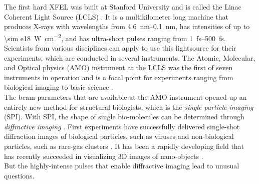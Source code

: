 %
The first hard XFEL was built at Stanford University and is called the Linac Coherent Light Source (LCLS) \citep{Emma-2010-NatPho}. It is a multikilometer long machine that produces X-rays with wavelengths from \SIrange{4.6}{0.1}{\nano\meter}, has intensities of up to \SI{\sim e18}{\watt\per\square\centi\meter}, and has ultra-short pulses ranging from \SIrange{1}{500}{\femto\second}. Scientists from various disciplines can apply to use this lightsource for their experiments, which are conducted in several instruments. The Atomic, Molecular, and Optical physics (AMO) instrument at the LCLS was the first of seven instruments in operation and is a focal point for experiments ranging from biological imaging to basic science \citep{Bostedt-2016-RMP}.\\[1\baselineskip]
%
The beam parameters that are available at the AMO instrument opened up an entirely new method for structural biologists, which is the \textit{single particle imaging} (SPI). With SPI, the shape of single bio-molecules can be determined through \textit{diffractive imaging} \citep{Chapman-2006-NatPhys}. First experiments have successfully delivered single-shot diffraction images of biological particles, such as viruses \citep{Seibert-2011-Nature} and non-biological particles, such as rare-gas clusters \citep{Gomez-2014-Science}. It has been a rapidly developing field that has recently succeeded in visualizing 3D images of nano-objects \citep{Ekeberg-2015-PRL,Barke-2015-NatComm}.\\[1\baselineskip]
%
But the highly-intense pulses that enable diffractive imaging lead to unusual questions. 
%
